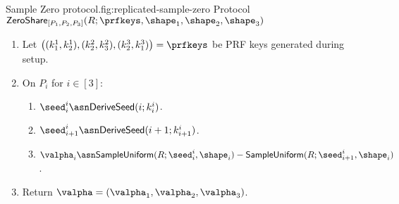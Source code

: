 \begin{Boxfig}{Sample Zero protocol.}{fig:replicated-sample-zero}
  {Protocol $\mathsf{ZeroShare}_{[P_1, P_2, P_3]}(R; \prfkeys, \shape_1, \shape_2, \shape_3)$}
  
  \begin{enumerate}
  \item Let $\left( (k_1^1, k_2^1), (k_2^2, k_3^2), (k_2^3, k_1^3) \right) = \prfkeys$ be PRF keys generated during setup.
  
  \item On $P_i$ for $i \in [3]$:
  \begin{enumerate}
    \item ${\seed}^i_i \asn \mathsf{DeriveSeed}(i; k^i_i)$.
    \item ${\seed}^i_{i+1} \asn \mathsf{DeriveSeed}(i + 1; k^i_{i+1})$.
    \item $\valpha_i \asn \mathsf{SampleUniform}(R; \seed^i_i, \shape_i) - \mathsf{SampleUniform}(R; \seed^i_{i+1}, \shape_i)$.
  \end{enumerate}
  
  \item Return $\valpha = \left( \valpha_1, \valpha_2, \valpha_3 \right)$.
  \end{enumerate}
\end{Boxfig}
